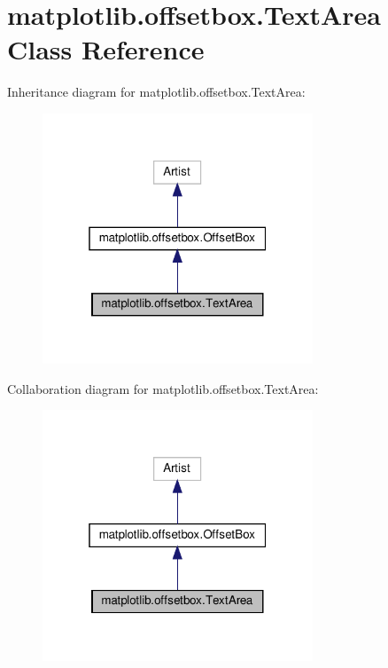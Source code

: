 \hypertarget{classmatplotlib_1_1offsetbox_1_1TextArea}{}\section{matplotlib.\+offsetbox.\+Text\+Area Class Reference}
\label{classmatplotlib_1_1offsetbox_1_1TextArea}


Inheritance diagram for matplotlib.\+offsetbox.\+Text\+Area\+:
\nopagebreak
\begin{figure}[H]
\begin{center}
\leavevmode
\includegraphics[width=229pt]{classmatplotlib_1_1offsetbox_1_1TextArea__inherit__graph}
\end{center}
\end{figure}


Collaboration diagram for matplotlib.\+offsetbox.\+Text\+Area\+:
\nopagebreak
\begin{figure}[H]
\begin{center}
\leavevmode
\includegraphics[width=229pt]{classmatplotlib_1_1offsetbox_1_1TextArea__coll__graph}
\end{center}
\end{figure}
